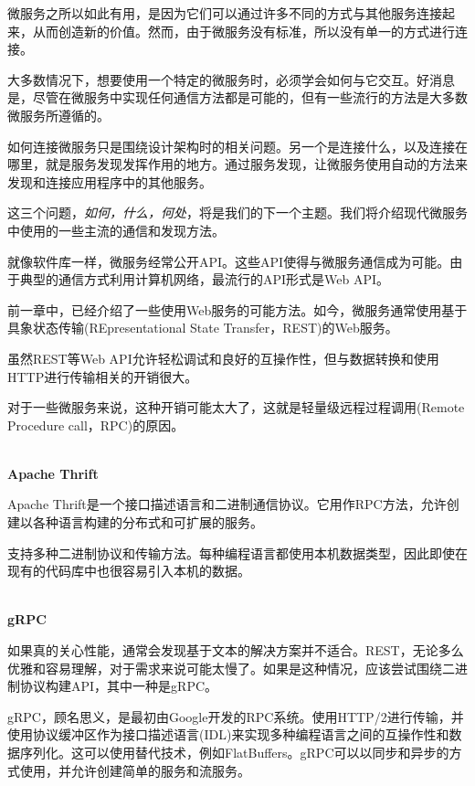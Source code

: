 
微服务之所以如此有用，是因为它们可以通过许多不同的方式与其他服务连接起来，从而创造新的价值。然而，由于微服务没有标准，所以没有单一的方式进行连接。

大多数情况下，想要使用一个特定的微服务时，必须学会如何与它交互。好消息是，尽管在微服务中实现任何通信方法都是可能的，但有一些流行的方法是大多数微服务所遵循的。

如何连接微服务只是围绕设计架构时的相关问题。另一个是连接什么，以及连接在哪里，就是服务发现发挥作用的地方。通过服务发现，让微服务使用自动的方法来发现和连接应用程序中的其他服务。

这三个问题，\textit{如何，什么，何处}，将是我们的下一个主题。我们将介绍现代微服务中使用的一些主流的通信和发现方法。


就像软件库一样，微服务经常公开API。这些API使得与微服务通信成为可能。由于典型的通信方式利用计算机网络，最流行的API形式是Web API。

前一章中，已经介绍了一些使用Web服务的可能方法。如今，微服务通常使用基于具象状态传输(REpresentational State Transfer，REST)的Web服务。


虽然REST等Web API允许轻松调试和良好的互操作性，但与数据转换和使用HTTP进行传输相关的开销很大。

对于一些微服务来说，这种开销可能太大了，这就是轻量级远程过程调用(Remote Procedure call，RPC)的原因。

\hspace*{\fill} \\ %
\noindent
\textbf{Apache Thrift}

Apache Thrift是一个接口描述语言和二进制通信协议。它用作RPC方法，允许创建以各种语言构建的分布式和可扩展的服务。

支持多种二进制协议和传输方法。每种编程语言都使用本机数据类型，因此即使在现有的代码库中也很容易引入本机的数据。

\hspace*{\fill} \\ %
\noindent
\textbf{gRPC}

如果真的关心性能，通常会发现基于文本的解决方案并不适合。REST，无论多么优雅和容易理解，对于需求来说可能太慢了。如果是这种情况，应该尝试围绕二进制协议构建API，其中一种是gRPC。

gRPC，顾名思义，是最初由Google开发的RPC系统。使用HTTP/2进行传输，并使用协议缓冲区作为接口描述语言(IDL)来实现多种编程语言之间的互操作性和数据序列化。这可以使用替代技术，例如FlatBuffers。gRPC可以以同步和异步的方式使用，并允许创建简单的服务和流服务。 

